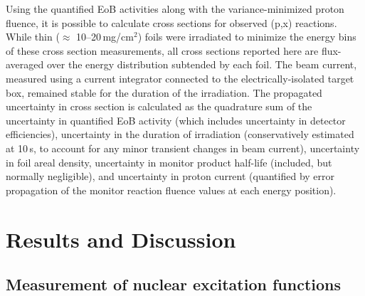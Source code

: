 Using the quantified EoB activities along with the variance-minimized proton fluence, it is possible to calculate 
cross sections for 
observed (p,x) reactions.
While thin ($\approx$ 10--20\,mg/cm$^2$)  foils were irradiated to minimize the energy bins of these cross section measurements, 
all cross sections reported here are flux-averaged  
over the energy distribution subtended by each foil.
The beam current, measured using a current integrator connected to the electrically-isolated target box, remained stable for the duration of the irradiation.
The propagated uncertainty in cross section is calculated as the quadrature sum of the uncertainty in quantified EoB activity (which includes uncertainty in detector efficiencies), uncertainty in the duration of irradiation (conservatively estimated at 10\,s, to account for any minor transient changes in beam current), uncertainty in foil areal density, uncertainty in monitor product half-life (included, but normally negligible),  and uncertainty in proton current (quantified by error propagation of the monitor reaction fluence values  at each energy position).





\section{\label{sec:results_U5_d}Results and Discussion}


\subsection{Measurement of nuclear excitation functions}

